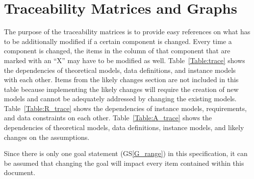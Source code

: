 \documentclass[12pt]{article}
\newcommand{\gsref}[1]{GS\ref{#1}}
\begin{document}
\newpage

\section{Traceability Matrices and Graphs}
\label{trace}

The purpose of the traceability matrices is to provide easy references on what
has to be additionally modified if a certain component is changed.  Every time a
component is changed, the items in the column of that component that are marked
with an ``X'' may have to be modified as well.  Table~\ref{Table:trace} shows 
the dependencies of theoretical models, data definitions, and instance models 
with each other. Items from the likely changes section are not included in this 
table because implementing the likely changes will require the creation of new 
models and cannot be adequately addressed by changing the existing models. 
Table~\ref{Table:R_trace} shows the dependencies of instance models, 
requirements, and data constraints on each other. Table~\ref{Table:A_trace} 
shows the dependencies of theoretical models, data definitions, instance 
models, and likely changes on the assumptions. 

Since there is only one goal statement (\gsref{G_range}) in this specification, 
it can be assumed that changing the goal will impact every item contained 
within this document.
\end{document}
